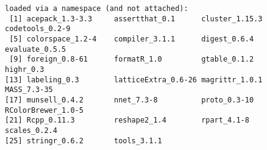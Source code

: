 \documentclass[9pt,english]{extarticle}\usepackage[]{graphicx}\usepackage[]{color}
\makeatletter
\newenvironment{kframe}{%
 \def\at@end@of@kframe{}%
 \ifinner\ifhmode%
  \def\at@end@of@kframe{\end{minipage}}%
  \begin{minipage}{\columnwidth}%
 \fi\fi%
 \def\FrameCommand##1{\hskip\@totalleftmargin \hskip-\fboxsep
 \colorbox{shadecolor}{##1}\hskip-\fboxsep
     \hskip-\linewidth \hskip-\@totalleftmargin \hskip\columnwidth}%
 \MakeFramed {\advance\hsize-\width
   \@totalleftmargin\z@ \linewidth\hsize
   \@setminipage}}%
 {\par\unskip\endMakeFramed%
 \at@end@of@kframe}
\newenvironment{knitrout}{}{} %
\makeatother
\begin{document}
\begin{linenumbers}
\begin{knitrout}
\begin{kframe}
\begin{verbatim}
loaded via a namespace (and not attached):
 [1] acepack_1.3-3.3     assertthat_0.1      cluster_1.15.3      codetools_0.2-9    
 [5] colorspace_1.2-4    compiler_3.1.1      digest_0.6.4        evaluate_0.5.5     
 [9] foreign_0.8-61      formatR_1.0         gtable_0.1.2        highr_0.3          
[13] labeling_0.3        latticeExtra_0.6-26 magrittr_1.0.1      MASS_7.3-35        
[17] munsell_0.4.2       nnet_7.3-8          proto_0.3-10        RColorBrewer_1.0-5 
[21] Rcpp_0.11.3         reshape2_1.4        rpart_4.1-8         scales_0.2.4       
[25] stringr_0.6.2       tools_3.1.1        
\end{verbatim}
\end{kframe}
\end{knitrout}


\end{linenumbers}
\end{document}
